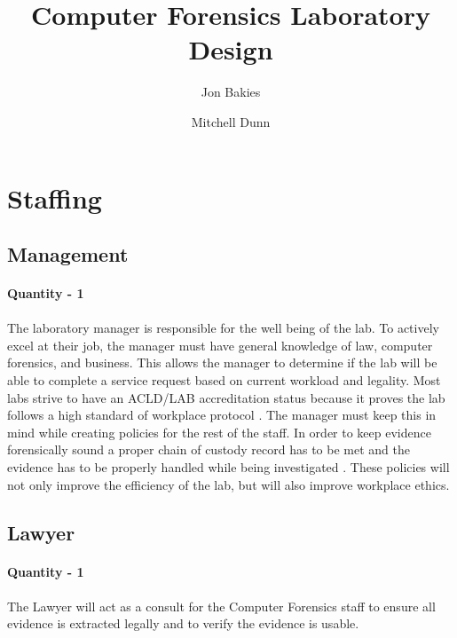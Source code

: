 \documentclass[12pt]{article}
\begin{document}
\title{Computer Forensics Laboratory Design}
\author{Jon Bakies \and Mitchell Dunn} 

\maketitle
\newpage

\tableofcontents
\newpage

\section{Staffing}
\subsection {Management} 
\paragraph{Quantity - 1}
\paragraph{} The laboratory manager is responsible for the well being of the lab.
To actively excel at their job, the manager must have general knowledge of law, computer forensics, and business.
This allows the manager to determine if the lab will be able to complete a service request based on current workload and legality. 
Most labs strive to have an ACLD/LAB accreditation status because it proves the lab follows a high standard of workplace protocol \cite[p~.117]{hayes}.
The manager must keep this in mind while creating policies for the rest of the staff.
In order to keep evidence forensically sound a proper chain of custody record has to be met and the evidence has to be properly handled while being investigated \cite[p.~2]{hayes}.
These policies will not only improve the efficiency of the lab, but will also improve workplace ethics.
\subsection{Lawyer } 
\paragraph{Quantity - 1}
\paragraph{} The Lawyer will act as a consult for the Computer Forensics staff to ensure all evidence is extracted legally and to verify the evidence is usable.
\end{document}

